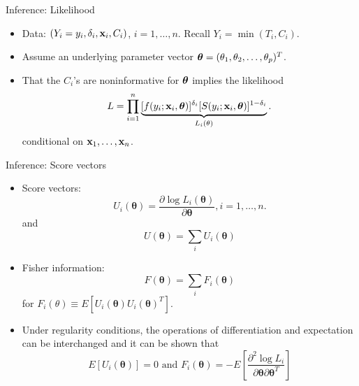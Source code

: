 \documentclass{beamer}
\newcommand{\boldtheta}{{\boldsymbol \theta}}
\begin{document}
\begin{frame} {Inference: Likelihood}

\begin{itemize}
\item Data: $ (Y_i = y_i, \delta_i , {\bf x}_i,  C_i)$, $i = 1, \dots, n$.  Recall $Y_i = \min(T_i, C_i)$.


\item Assume an underlying parameter vector $\mbox{\boldmath $\theta$} = (\theta_1, \theta_2, \ldots,
\theta_p)^T$.


\item That the $C_i$'s are noninformative for $\mbox{\boldmath $\theta$}$ implies the likelihood
\begin{eqnarray}
 L = \prod_{i=1}^n \underbrace{[f(y_i; {\bf x}_i, {\boldsymbol \theta})]^{\delta_i} [ S(y_i; {\bf x}_i, {\boldsymbol \theta})]^{1-\delta_i}}_{ L_i (\theta)}.
  \label{PLik2}
\end{eqnarray}
conditional on ${\bf x}_1, \dots, {\bf x}_n$. 
\end{itemize}


\end{frame}

\begin{frame} {Inference: Score vectors}
\begin{itemize}
\item Score vectors:
\[
U_i(\boldtheta)  = \frac{\partial\log L_i (\boldtheta) }{ \partial \boldtheta} , i =1, \dots, n.
\]
and
\[
U (\boldtheta) = \sum_i U_i(\boldtheta)
\]
\item Fisher information:
\[
F(\boldtheta) = \sum_i F_i(\boldtheta)
\]
for $F_i(\theta) \equiv E[U_i(\boldtheta)U_i(\boldtheta)^T ]$.

\item Under regularity conditions, the operations of differentiation and  expectation can be interchanged and it can be shown that 
\[
E[U_i(\boldtheta)] = 0 \text{ and } F_i(\boldtheta) = - E\left[ \frac{\partial^2 \log L_i}{ \partial \boldtheta \partial \boldtheta^T} \right]
\]
\end{itemize}
\end{frame}
\end{document}
